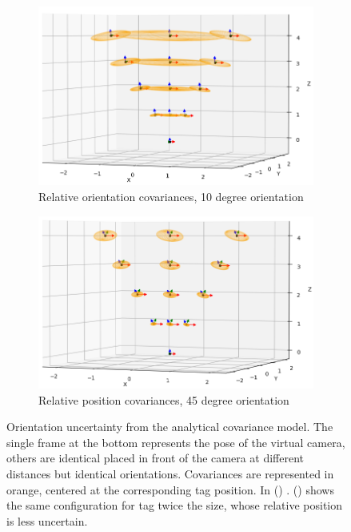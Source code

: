 \begin{figure}[h]
    \centering
    \begin{subfigure}{.50\linewidth}
        \centering
        \includegraphics[width=\textwidth]{figures/apriltag_cov_O_10deg.png}
        \caption{Relative orientation covariances, 10 degree orientation \label{fig:apriltag_cov_O_10deg}}
    \end{subfigure}%
    \hfill
    \begin{subfigure}{.50\linewidth}
        \centering
        \includegraphics[width=\textwidth]{figures/apriltag_cov_O_45deg.png}
        \caption{Relative position covariances, 45 degree orientation \label{fig:apriltag_cov_O_45deg}}
    \end{subfigure}%
    \caption{Orientation uncertainty from the analytical covariance model. The single frame at the bottom represents the pose of the virtual camera, others are identical 
    \apriltags placed in front of the camera at different distances but identical orientations. Covariances are represented in orange, centered at the corresponding tag 
    position.
    In () . 
    () shows the same configuration for tag twice the size, whose relative position is less uncertain.}
    \label{fig:apriltag_cov_O}
\end{figure}



